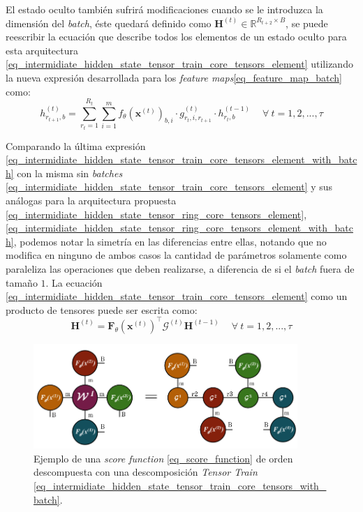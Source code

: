 \documentclass[spanish]{article}
\theoremstyle{definition}
\theoremstyle{remark}
\numberwithin{equation}{section}
\numberwithin{equation}{section} %
\begin{document}
El estado oculto también sufrirá modificaciones cuando se le introduzca la dimensión del \textit{batch}, éste quedará definido como $\boldsymbol{H}^{(t)} \in \mathbb{R}^{R_{t+2} \times B}$, se puede reescribir la ecuación que describe todos los elementos de un estado oculto para esta arquitectura \eqref{eq_intermidiate_hidden_state_tensor_train_core_tensors_element} utilizando la nueva expresión desarrollada para los \textit{feature maps}\eqref{eq_feature_map_batch} como:
\begin{equation}
\label{eq_intermidiate_hidden_state_tensor_train_core_tensors_element_with_batch}
h^{(t)}_{r_{t+1},b}  
= \sum^{R_{t}}_{r_{t}=1} \sum_{i=1}^m  f_\theta (\boldsymbol{x}^{(t)})_{b,i} \cdot g^{(t)}_{r_{t},i,r_{t+1}} \cdot  {h}^{(t-1)}_{r_t,b} \ \quad \forall \ t=1,2,...,\tau
\end{equation} \par
Comparando la última expresión \eqref{eq_intermidiate_hidden_state_tensor_train_core_tensors_element_with_batch} con la misma sin \textit{batches} \eqref{eq_intermidiate_hidden_state_tensor_train_core_tensors_element} y sus análogas para la arquitectura propuesta \eqref{eq_intermidiate_hidden_state_tensor_ring_core_tensors_element}, \eqref{eq_intermidiate_hidden_state_tensor_ring_core_tensors_element_with_batch}, podemos notar la simetría en las diferencias entre ellas, notando que no modifica en ninguno de ambos casos la cantidad de parámetros solamente como paraleliza las operaciones que deben realizarse, a diferencia de si el \textit{batch} fuera de tamaño $1$. La ecuación \eqref{eq_intermidiate_hidden_state_tensor_train_core_tensors_element} como un producto de tensores puede ser escrita como: 
\begin{equation}
\label{eq_intermidiate_hidden_state_tensor_train_core_tensors_with_batch}
\boldsymbol{H}^{(t)}  = \boldsymbol{F}_\theta(\boldsymbol{x}^{(t)})^\intercal \mathcal{G}^{(t)}  \boldsymbol{H}^{(t-1)} \ \quad \forall \ t=1,2,...,\tau
\end{equation} \par
\begin{figure}[H]
 \centering
 \includegraphics[width=10cm]{img/ejemplo_score_function_descomposicion_tensor_train_con_batch.png}
\caption[Ejemplo \textit{score function} con una descomposición \textit{Tensor Train}]{\footnotesize{ Ejemplo de una \textit{score function} \eqref{eq_score_function} de orden descompuesta con una descomposición \textit{Tensor Train} \eqref{eq_intermidiate_hidden_state_tensor_train_core_tensors_with_batch}. }}
\label{fig:score_function_tensor_train_with_batch}
\end{figure}\par
\end{document}
